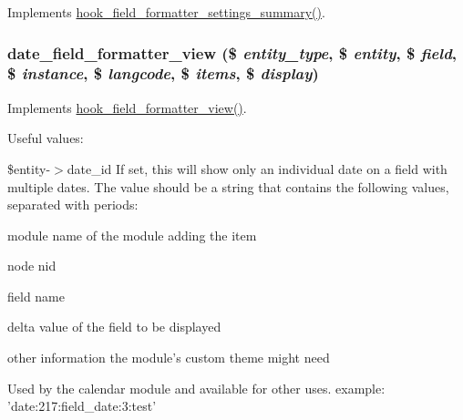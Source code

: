 \label{date_8field_8inc_a10367ff3000283b8d15281b0340a318a}
Implements \hyperlink{group__field__types_ga0cdef0fb8588dde07292df1b86f06d81}{hook\_\-field\_\-formatter\_\-settings\_\-summary()}. \hypertarget{date_8field_8inc_a054ff404fcc81a7bd9937070266c87a6}{
\subsubsection[{date\_\-field\_\-formatter\_\-view}]{\setlength{\rightskip}{0pt plus 5cm}date\_\-field\_\-formatter\_\-view (\$ {\em entity\_\-type}, \/  \$ {\em entity}, \/  \$ {\em field}, \/  \$ {\em instance}, \/  \$ {\em langcode}, \/  \$ {\em items}, \/  \$ {\em display})}}
\label{date_8field_8inc_a054ff404fcc81a7bd9937070266c87a6}
Implements \hyperlink{group__field__formatter_gaa588d99481fa147a1c88416e55fdfad6}{hook\_\-field\_\-formatter\_\-view()}.

Useful values:

\$entity-\/$>$date\_\-id If set, this will show only an individual date on a field with multiple dates. The value should be a string that contains the following values, separated with periods:
\begin{DoxyItemize}
\item module name of the module adding the item
\item node nid
\item field name
\item delta value of the field to be displayed
\item other information the module's custom theme might need
\end{DoxyItemize}

Used by the calendar module and available for other uses. example: 'date:217:field\_\-date:3:test'

